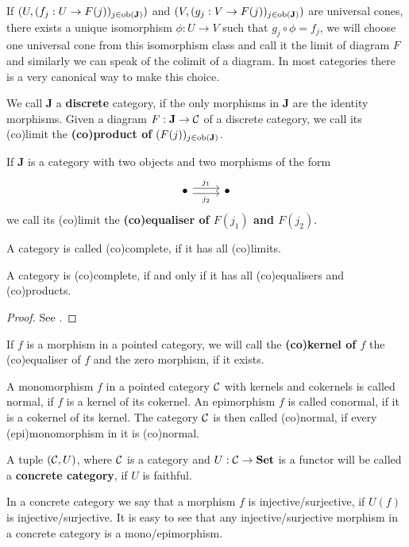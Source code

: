 \begin{remark}
    If $(U, (f_j : U \to F(j))_{j\in\mathbf{\text{ob}(J)}})$ and $(V, (g_j : V \to F(j))_{j\in\mathbf{\text{ob}(J)}})$ are universal cones, 
    there exists a unique isomorphism $\phi: U \to V$ such that $g_j\circ\phi=f_j$, we will choose one universal cone from this isomorphism class 
    and call it the limit of diagram $F$ and similarly we can speak of the colimit of a diagram. In most categories there is a very canonical way to make this choice. 
\end{remark}
\begin{definition}
    We call $\mathbf{J}$ a \textbf{discrete} category, if the only morphisms in $\mathbf{J}$ are the identity morphisms.
    Given a diagram $F:\mathbf{J}\to\mathcal{C}$ of a discrete category, we call its (co)limit the \textbf{(co)product of} $(F(j))_{j\in\mathbf{\text{ob}(J)}}$.
\end{definition}
\begin{definition}
    If $\mathbf{J}$ is a category with two objects and two morphisms
    of the form 
        \[\begin{tikzcd}
        \bullet & \bullet
        \arrow["{j_1}", shift left, from=1-1, to=1-2]
        \arrow["{j_2}"', shift right, from=1-1, to=1-2]
    \end{tikzcd}\]
    we call its (co)limit the \textbf{(co)equaliser of $F(j_1)$ and $F(j_2)$}.
\end{definition}
\begin{definition}
    A category is called (co)complete, if it has all (co)limits.
\end{definition}
\begin{theorem}
    A category is (co)complete, if and only if it has all (co)equalisers and (co)products.
\end{theorem}
\begin{proof}
    See \cite[Proposition 5.1.26]{Leinster14}.
\end{proof}
\begin{definition}
    If $f$ is a morphism in a pointed category, we will call the \textbf{(co)kernel of $f$} the (co)equaliser of $f$ and the zero morphism, if it exists.
\end{definition}
\begin{definition}
    A monomorphism $f$ in a pointed category $\mathcal{C}$ with kernels and cokernels is called normal, if $f$ is a kernel of its cokernel. An 
    epimorphism $f$ is called conormal, if it is a cokernel of its kernel. The category $\mathcal{C}$ is then called 
    (co)normal, if every (epi)monomorphism 
    in it is (co)normal.
\end{definition}
\begin{definition}
    A tuple $(\mathcal{C},U)$, where $\mathcal{C}$ is a category and $U:\mathcal{C}\to\mathbf{Set}$ is a functor will be called a \textbf{concrete category}, if $U$ is faithful.
\end{definition}
    In a concrete category we say that a morphism $f$ is injective/surjective, if $U(f)$ is injective/surjective. It is easy to see 
    that any injective/surjective morphism in a concrete category is a mono/epimorphism.
\iffalse
